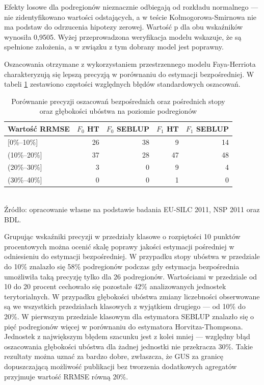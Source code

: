 Efekty losowe dla podregionów nieznacznie odbiegają od rozkładu normalnego --- nie zidentyfikowano wartości odstających, a w teście Kołmogorowa-Smirnowa nie ma podstaw do odrzucenia hipotezy zerowej. Wartość p dla obu wskaźników wynosiła 0,9505. Wyżej przeprowadzona weryfikacja modelu wskazuje, że są spełnione założenia, a w związku z tym dobrany model jest poprawny.

Oszacowania otrzymane z wykorzystaniem przestrzennego modelu Faya-Herriota charakteryzują się lepszą precyzją w porównaniu do estymacji bezpośredniej. W tabeli \ref{tab:podreg_prec} zestawiono częstości względnych błędów standardowych oszacowań.

\begin{table}[htp]
\caption{Porównanie precyzji oszacowań bezpośrednich oraz pośrednich stopy oraz głębokości ubóstwa na poziomie podregionów}
\label{tab:podreg_prec}
\centering
\begin{tabular}{lrrrr}
\hline
Wartość RRMSE & $F_0$ HT & $F_0$ SEBLUP & $F_1$ HT & $F_1$ SEBLUP\tabularnewline
\hline
{[}0\%--10\%{]} & 26 & 38 & 9 & 14\tabularnewline
(10\%--20\%{]} & 37 & 28 & 47 & 48\tabularnewline
(20\%--30\%{]} & 3 & 0 & 9 & 4\tabularnewline
(30\%--40\%{]} & 0 & 0 & 1 & 0\tabularnewline
\hline
\end{tabular}\\
\small{Źródło: opracowanie własne na podstawie badania EU-SILC 2011, NSP 2011 oraz BDL.}
\end{table}

Grupując wskaźniki precyzji w przedziały klasowe o rozpiętości 10 punktów procentowych można ocenić skalę poprawy jakości estymacji pośredniej w odniesieniu do estymacji bezpośredniej. W przypadku stopy ubóstwa w przedziale do 10\% znalazło się 58\% podregionów podczas gdy estymacja bezpośrednia umożliwiła taką precyzję tylko dla 26 podregionów. Wartościami w przedziale od 10 do 20 procent cechowało się pozostałe 42\% analizowanych jednostek terytorialnych. W przypadku głębokości ubóstwa zmiany liczebności obserwowane są we wszystkich przedziałach klasowych z wyjątkiem drugiego --- od 10\% do 20\%. W pierwszym przedziale klasowym dla estymatora SEBLUP znalazło się o pięć podregionów więcej w porównaniu do estymatora Horvitza-Thompsona. Jednostek z największym błędem szacunku jest z kolei mniej --- względny błąd oszacowania głębokości ubóstwa dla żadnej jednostki nie przekracza 30\%. Takie rezultaty można uznać za bardzo dobre, zwłaszcza, że GUS za granicę dopuszczającą możliwość publikacji bez tworzenia dodatkowych agregatów przyjmuje wartość RRMSE równą 20\%.

